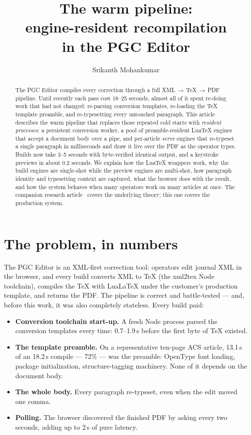 \documentclass{ltugboat}
\title{The warm pipeline:\\ engine-resident recompilation\\ in the PGC Editor}
\author{Srikanth Mohankumar}
\def\LuaTeX{Lua\TeX}
\def\LuaLaTeX{Lua\LaTeX}
\begin{document}
\maketitle

\begin{abstract}
The PGC Editor compiles every correction through a full
XML\,$\to$\,\TeX\,$\to$\,PDF pipeline. Until recently each pass cost
18--25 seconds, almost all of it spent re-doing work that had not
changed: re-parsing conversion templates, re-loading the \TeX{}
template preamble, and re-typesetting every untouched paragraph. This
article describes the warm pipeline that replaces those repeated cold
starts with \emph{resident processes}: a persistent conversion worker,
a pool of preamble-resident \LuaTeX{} engines that accept a document
body over a pipe, and per-article \emph{serve} engines that re-typeset a
single paragraph in milliseconds and draw it live over the PDF as the
operator types. Builds now take 3--5 seconds with byte-verified
identical output, and a keystroke previews in about 0.2 seconds.
We explain how the \LuaTeX{} wrappers work, why the build engines are
single-shot while the preview engines are multi-shot, how paragraph
identity and typesetting context are captured, what the browser does
with the result, and how the system behaves when many operators work on
many articles at once. The companion research
article~\cite{srik:eventually} covers the underlying theory; this one
covers the production system.
\end{abstract}

\section{The problem, in numbers}

The PGC Editor is an XML-first correction tool: operators edit journal
XML in the browser, and every build converts XML to \TeX{} (the
\textsf{xml2tex} Node toolchain), compiles the \TeX{} with \LuaLaTeX{}
under the customer's production template, and returns the PDF. The
pipeline is correct and battle-tested --- and, before this work, it was
also completely stateless. Every build paid:

\begin{itemize}
\item \textbf{Conversion toolchain start-up.} A fresh Node process
  parsed the conversion templates every time: 0.7--1.9\,s before the
  first byte of \TeX{} existed.
\item \textbf{The template preamble.} On a representative ten-page ACS
  article, 13.1\,s of an 18.2\,s compile --- 72\% --- was the preamble:
  OpenType font loading, package initialization, structure-tagging
  machinery. None of it depends on the document body.
\item \textbf{The whole body.} Every paragraph re-typeset, even when
  the edit moved one comma.
\item \textbf{Polling.} The browser discovered the finished PDF by
  asking every two seconds, adding up to 2\,s of pure latency.
\end{itemize}
\end{document}
